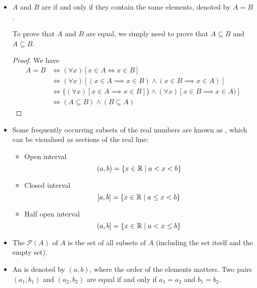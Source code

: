 \begin{itemize}
\begin{proof}
Let $x\in A$. 
Since $A \subseteq B$ and $x\in A$, $x\in B$. 
Since $B \subseteq C$ and $x\in B$, $x\in C$. 
Hence $A \subseteq C$.
\end{proof}

$A$ is a  of $B$ if $A \subseteq B$ and $A \neq B$, denoted by $A \subset B$.

Using this definition, we have the relationship 
\[ \NN \subset \ZZ \subset \QQ \subset \RR \]

\item $A$ and $B$ are  if and only if they contain the same elements, denoted by $A=B$.

To prove that $A$ and $B$ are equal, we simply need to prove that $A \subseteq B$ and $A \subseteq B$.

\begin{proof}
We have 
\begin{align*}
A = B &\iff (\forall x)[x \in A \iff x \in B] \\
&\iff (\forall x)[(x \in A \implies x \in B) \land (x \in B \implies x \in A)] \\
&\iff \{(\forall x)[x \in A \implies x \in B]\} \land {(\forall x)[x \in B \implies x \in A)]} \\
&\iff (A \subseteq B) \land (B \subseteq A)
\end{align*}
\end{proof}

\item Some frequently occurring subsets of the real numbers are known as , which can be visualised as sections of the real line:
\begin{itemize}
\item Open interval
\[ (a,b) = \{x\in\mathbb R \mid a<x<b\} \]
\item Closed interval
\[ [a,b] = \{x\in\mathbb R \mid a\le x<b\} \]
\item Half open interval
\[ (a,b] = \{x\in\mathbb R \mid a<x\le b\} \]
\end{itemize}

\item The  $\mathcal{P}(A)$ of $A$ is the set of all subsets of $A$ (including the set itself and the empty set).

\item An  is denoted by $(a,b)$, where the order of the elements matters. Two pairs $(a_1,b_1)$ and $(a_2,b_2)$ are equal if and only if $a_1=a_2$ and $b_1=b_2$. 


\end{itemize}
